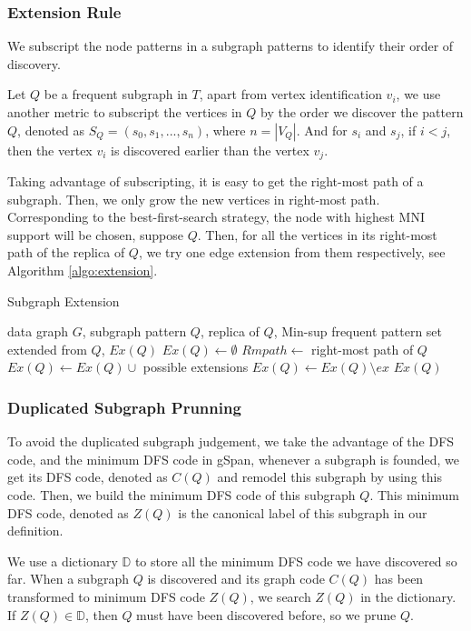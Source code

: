 \subsubsection{Extension Rule}
We subscript the node patterns in a subgraph patterns to identify their order of discovery.
\begin{defn}
	Let $Q$ be a frequent subgraph in $T$, apart from vertex identification $v_i$, we use another metric to subscript the vertices in $Q$ by the order we discover the pattern $Q$, denoted as $S_Q=(s_0,s_1,...,s_n)$, where $n=|V_Q|$. And for $s_i$ and $s_j$, if $i<j$, then the vertex $v_i$ is discovered earlier than the vertex $v_j$.
\end{defn}	
Taking advantage of subscripting, it is easy to get the right-most path of a subgraph. Then, we only grow the new vertices in right-most path. Corresponding to the best-first-search strategy, the node with highest MNI support will be chosen, suppose $Q$. Then, for all the vertices in its right-most path of the replica of $Q$, we try one edge extension from them respectively, see Algorithm \ref{algo:extension}.
\begin{algorithm}
	\caption{Subgraph Extension}\label{algo:extension}
	\begin{algorithmic}[1] 
	\REQUIRE data graph $G$, subgraph pattern $Q$, replica of $Q$, {\sf Min-sup}
	\ENSURE frequent pattern set extended from $Q$, $Ex(Q)$
	\STATE $Ex(Q)\leftarrow\emptyset$
	\STATE $Rmpath\leftarrow$ right-most path of $Q$	
	\STATE $Ex(Q)\leftarrow Ex(Q)\cup$ possible extensions
	\ENDFOR 	
	\STATE $Ex(Q)\leftarrow Ex(Q)\setminus ex$
	\ENDIF
	\ENDFOR
	\RETURN $Ex(Q)$
	\end{algorithmic}
	\end{algorithm}

\subsubsection{Duplicated Subgraph Prunning}
To avoid the duplicated subgraph judgement, we take the advantage of the DFS code, and the minimum DFS code in gSpan\cite{YH02}, whenever a subgraph is founded, we get its DFS code, denoted as $C(Q)$ and remodel this subgraph by using this code. Then, we build the minimum DFS code of this subgraph $Q$. This minimum DFS code, denoted as $Z(Q)$ is the canonical label of this subgraph in our definition.

\par We use a dictionary $\mathbb{D}$ to store all the minimum DFS code we have discovered so far. When a subgraph $Q$ is discovered and its graph code $C(Q)$ has been transformed to minimum DFS code $Z(Q)$, we search $Z(Q)$ in the dictionary. If $Z(Q)\in \mathbb{D}$, then $Q$ must have been discovered before, so we prune $Q$.


